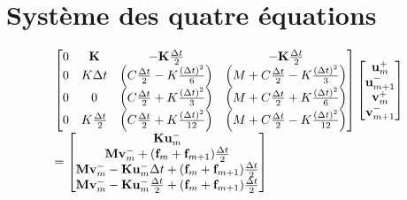 \documentclass[12pt,a4paper]{report}
\begin{document}
\section{Système des quatre équations}
\begin{equation}
\begin{array}{l l}
		\begin{bmatrix}	   
			   0 
			   &\mathbf{K} 
			   &-\mathbf{K}\frac{\Delta t}{2} 
			   &-\mathbf{K}\frac{\Delta t}{2} 
		   \\  
			   0 
			   &K \Delta t
			   & \left( C \frac{\Delta t}{2}
			    		- K \frac{(\Delta t)^2}{6}
			     \right)
			   & \left(	M
			    		+ C \frac{\Delta t}{2}
			    		- K \frac{(\Delta t)^2}{3} 
			     \right)
		   \\ 
			   0
			   &0
			   & \left(   C \frac{\Delta t}{2}
			    		+ K \frac{(\Delta t)^2}{3}
			     \right)
			   & \left(	  M
			    		+ C \frac{\Delta t}{2}
			    		+ K \frac{(\Delta t)^2}{6} 
			     \right)
			\\   
			   0
			   &K \frac{\Delta t}{2}
			   & \left(   C \frac{\Delta t}{2}
			    		+ K \frac{(\Delta t)^2}{12}
			     \right)
			   & \left(	M
			    		+ C \frac{\Delta t}{2}
			    		- K \frac{(\Delta t)^2}{12} 
			     \right)\\ 
		\end{bmatrix}
		\begin{bmatrix}
		   \mathbf{u}_m^+  		\\
		   \mathbf{u}_{m+1}^-  	\\
		   \mathbf{v}_m^+  		\\
		   \mathbf{v}_{m+1}^-  	\\
		\end{bmatrix}
	\\
		=  
		\begin{bmatrix}
			\mathbf{K} \mathbf{u}_m^- 
		\\
			\mathbf{M} \mathbf{v}_m^-
			 + (\mathbf{f}_m + \mathbf{f}_{m+1})  \frac{\Delta t}{2}
		 \\
			\mathbf{M} \mathbf{v}_m^-
			  - \mathbf{K} \mathbf{u}_m^- \Delta t
			  + (\mathbf{f}_m + \mathbf{f}_{m+1})  \frac{\Delta t}{2}
		\\
			  \mathbf{M} \mathbf{v}_m^-
		  	- \mathbf{K} \mathbf{u}_m^- \frac{\Delta t}{2}
		  	+ (\mathbf{f}_m + \mathbf{f}_{m+1})  \frac{\Delta t}{2}
		\end{bmatrix}
	
\end{array}
\end{equation}
\end{document}
